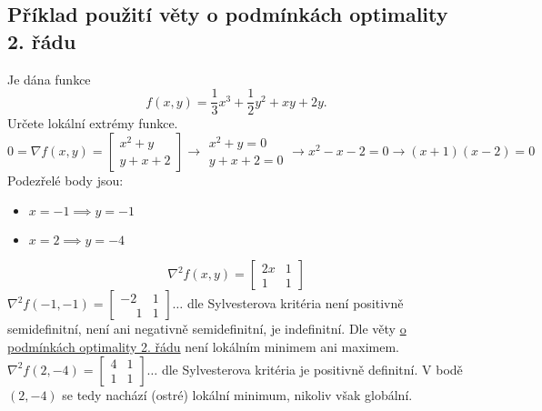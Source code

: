 \subsection{Příklad použití věty o podmínkách optimality 2. řádu}
Je dána funkce
\[
    f(x, y) = \frac{1}{3}x^3 + \frac{1}{2}y^2 + xy + 2y.
\]
Určete lokální extrémy funkce.
\[
    0 = \nabla f(x, y) =
    \begin{bmatrix}
        x^2 + y \\
        y + x + 2
    \end{bmatrix} \rightarrow
    \begin{matrix}
        x^2 + y = 0 \\
        y + x + 2 = 0
    \end{matrix} \rightarrow x^2 - x - 2 = 0 \rightarrow (x+1)(x-2) = 0
\]
Podezřelé body jsou:
\begin{itemize}
    \item $x = -1 \implies y = -1$
    \item $x = 2 \implies y = -4$
\end{itemize}
\[
    \nabla^2 f(x, y) =
    \begin{bmatrix}
        2x & 1 \\
        1 & 1
    \end{bmatrix}
\]
$\nabla^2 f(-1, -1) =
\begin{bmatrix}
    -2 & 1 \\
    \phantom{-}1 & 1
\end{bmatrix} \dots$ dle Sylvesterova kritéria není positivně semidefinitní, není ani negativně semidefinitní, je
indefinitní. Dle věty \hyperref[podOpt2]{o podmínkách optimality 2. řádu} není lokálním minimem ani maximem.\\
$\nabla^2 f(2, -4) =
\begin{bmatrix}
    4 & 1 \\
    1 & 1
\end{bmatrix} \dots$ dle Sylvesterova kritéria je positivně definitní. V bodě $(2, -4)$ se tedy nachází (ostré) lokální
minimum, nikoliv však globální.

